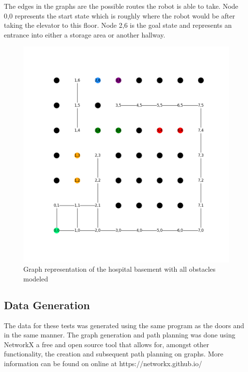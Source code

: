   The edges in the graphs are the possible routes the robot is able to take.
  Node 0,0 represents the start state which is roughly where the robot would
  be after taking the elevator to this floor. Node 2,6 is the goal state and represents
  an entrance into either a storage area or another hallway.

  \begin{figure}[!htb]
    \centering
    \includegraphics[width=\linewidth]{images/results/Full_Hospital.png}
    \caption{Graph representation of the hospital basement with all obstacles modeled}
    \label{figure:basement_congestion_full}
  \end{figure}



  \subsection{ Data Generation }

  The data for these tests was generated using the same program as the doors
  and in the same manner. The graph generation and path planning was done using
  NetworkX a free and open source tool that allows for, amongst other functionality, the creation and subsequent
  path planning on graphs. More information can be
  found on online at https://networkx.github.io/

